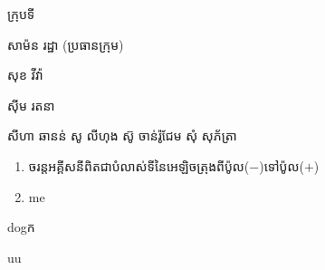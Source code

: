 \documentclass[15pt,a4paper]{article}
\author{james1}
\date{\today}
\newenvironment{kfont}{\khfont}{\par}
\begin{document}
\hfill\begin{minipage}{.5\linewidth}
\begin{kfont}ក្រុបទី\end{kfont} 2
\begin{kfont}សាម៉ន រដ្ឋា (ប្រធានក្រុម)\end{kfont}
\begin{kfont}សុខ វីវ៉ា\end{kfont}
\begin{kfont}សុីម រតនា\end{kfont}
សីហា ឆានន់ 
សូ លីហុង
 ស៊ូ ចាន់រ៉ូជែម
សុំ សុភ័ត្រា
\end{minipage}
\begin{enumerate}
\item 
\begin{kfont}
ចរន្តអគ្គីសនីពិតជាបំលាស់ទីនៃអេឡិចត្រុងពីប៉ូល(\(-\))ទៅប៉ូល(\(+\))
\end{kfont}
\item 
me
\end{enumerate}
dog\begin{kfont}ក\end{kfont}uu
\end{document}
